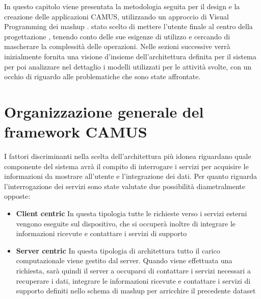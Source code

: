 In questo capitolo viene presentata la metodologia seguita per il design e la creazione delle applicazioni CAMUS, utilizzando un approccio di Visual Programming dei mashup \cite{DBLP:journals/tweb/CappielloMP15}. \upe stato scelto di mettere l'utente finale al centro della progettazione \cite{lieberman2006end}, tenendo conto delle sue esigenze di utilizzo e cercando di mascherare la complessità delle operazioni. %
Nelle sezioni successive verrà inizialmente fornita una visione d'insieme dell'architettura definita per il sistema per poi analizzare nel dettaglio i modelli utilizzati per le attività svolte, con un occhio di riguardo alle problematiche che sono state affrontate.

\section{Organizzazione generale del framework CAMUS\label{sec:architettura-sistema}}

I fattori discriminanti nella scelta dell'architettura più idonea riguardano quale componente del sistema avrà il compito di interrogare i servizi per acquisire le informazioni da mostrare all'utente e l'integrazione dei dati.
Per quanto riguarda l'interrogazione dei servizi sono state valutate due possibilità diametralmente opposte:

\begin{itemize}
	\item \textbf{Client centric}
	In questa tipologia tutte le richieste verso i servizi esterni vengono eseguite sul dispositivo, che si occuperà inoltre di integrare le informazioni ricevute e contattare i servizi di supporto
	\item \textbf{Server centric}
	In questa tipologia di architettura tutto il carico computazionale viene gestito dal server. Quando viene effettuata una richiesta, sarà quindi il server a occuparsi di contattare i servizi necessari a recuperare i dati, integrare le informazioni ricevute e contattare i servizi di supporto definiti nello schema di mashup per arricchire il precedente dataset
\end{itemize}

